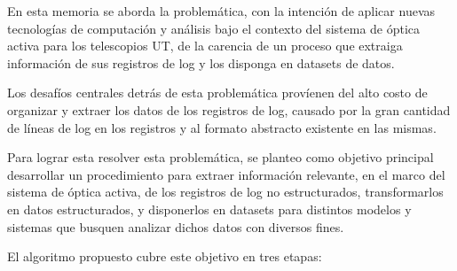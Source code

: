 
En esta memoria se aborda la problemática, con la intención de aplicar nuevas tecnologías de computación y análisis bajo el contexto del sistema de óptica activa para los telescopios UT, de la carencia de un proceso que extraiga información de sus registros de log y los disponga en datasets de datos.

Los desafíos centrales detrás de esta problemática províenen del alto costo de organizar y extraer los datos de los registros de log, causado por la gran cantidad de líneas de log en los registros y al formato abstracto existente en las mismas.

Para lograr esta resolver esta problemática, se planteo como objetivo principal desarrollar un procedimiento para extraer información relevante, en el marco del sistema de óptica activa, de los registros de log no estructurados, transformarlos en datos estructurados, y disponerlos en datasets para distintos modelos y sistemas que busquen analizar dichos datos con diversos fines.

El algoritmo propuesto cubre este objetivo en tres etapas:

